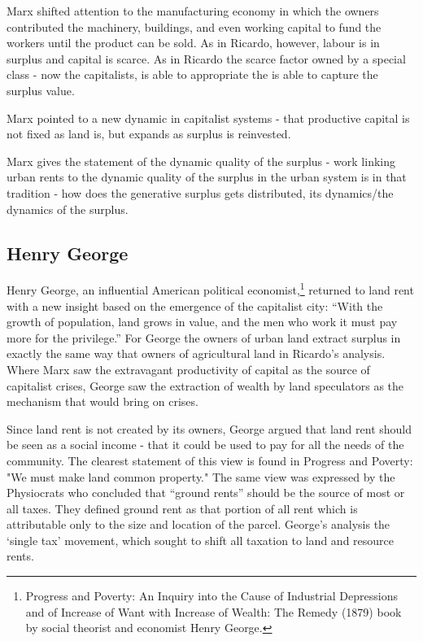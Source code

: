  Marx shifted attention to the manufacturing economy in which the owners contributed the machinery, buildings, and even working capital to fund the workers until the product can be sold. %
As in Ricardo, however, labour is in surplus and capital is scarce. As in Ricardo the scarce factor owned by a special class - now the capitalists, is able to appropriate the is able to capture the surplus value. %

Marx pointed to a new dynamic in capitalist systems - that productive capital is not fixed as land is, but  expands as surplus is reinvested. %

Marx gives the statement of the dynamic quality of the surplus
- work linking urban rents to the dynamic quality of the surplus in the urban system is in that tradition 
- how does the generative surplus gets distributed, its dynamics/the dynamics of the surplus. 
 
\subsection{Henry George} 


  Henry George, an influential American political economist,\footnote{Progress and Poverty: An Inquiry into the Cause of Industrial Depressions and of Increase of Want with Increase of Wealth: The Remedy (1879) book by social theorist and economist Henry George.}  returned to land rent with a new insight based on the emergence of the capitalist city: ``With the growth of population, land grows in value, and the men who work it must pay more for the privilege.'' For George the owners of urban land extract surplus in exactly the same way that owners of agricultural land in Ricardo's analysis. Where Marx saw the extravagant productivity of capital as the source of capitalist crises, George saw the extraction of wealth by land speculators as the mechanism that would bring on crises.
  
  Since land rent is not created by its owners, George argued that land rent should be seen as a social income - that it could be used to pay for all the needs of the community. The clearest statement of this view is found in Progress and Poverty: "We must make land common property." The same view was expressed by the Physiocrats who concluded  that ``ground rents'' should be the source of most or all taxes. They defined ground rent as that portion of all rent which is attributable only to the size and location of the parcel. George's analysis the `single tax' movement, which sought to shift all taxation to land  and resource rents.   

